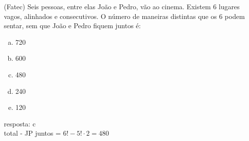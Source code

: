 \begin{ex}
 (Fatec) Seis pessoas, entre elas João e Pedro, vão ao cinema. Existem 6 lugares vagos, alinhados e consecutivos. O número de maneiras distintas que os 6 podem sentar, sem que João e Pedro fiquem juntos é:
    \begin{enumerate}[(a)]
    \item 720
    \item 600
    \item 480
    \item 240
    \item 120
    \end{enumerate}
      \begin{sol}  
      resposta: c \\
      total - JP juntos = $6!-5!\cdot2=480$
        
      \end{sol}
\end{ex}